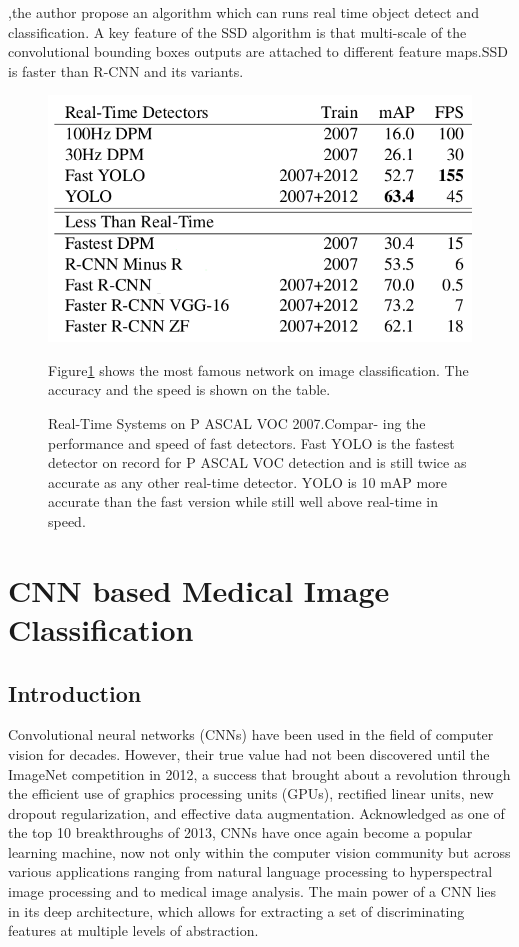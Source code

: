 \documentclass[10pt,twocolumn,letterpaper]{article}
\begin{document}
\cite{liu2016ssd},the author propose an algorithm which can runs real time object detect and classification. A key feature of the SSD algorithm is that multi-scale of the convolutional bounding boxes outputs are attached to different feature maps.SSD is faster than R-CNN and its variants.

\begin{figure}[htbp]
	\begin{center}
		\includegraphics[width=0.8\linewidth]{./Pic/test.png}
	\end{center}
	\caption{Real-Time Systems on P ASCAL VOC 2007.Compar-
		ing the performance and speed of fast detectors. Fast YOLO is
		the fastest detector on record for P ASCAL VOC detection and is
		still twice as accurate as any other real-time detector. YOLO is
		10 mAP more accurate than the fast version while still well above
		real-time in speed.}
	\label{fig:lxsfvgong}

	Figure\ref{fig:lxsfvgong} shows the most famous network on image classification. The accuracy and the speed is shown on the table.

\end{figure}

\section{CNN based Medical Image Classification}

\subsection{Introduction}

Convolutional neural networks (CNNs) have been used in the field of computer vision for decades. However, their true value had not been discovered until the ImageNet competition in 2012, a success that brought about a revolution through the efficient use of graphics processing units (GPUs), rectified linear units, new dropout regularization, and effective data augmentation. Acknowledged as one of the top 10 breakthroughs of 2013, CNNs have once again become a popular learning machine, now not only within the computer vision community but across various applications ranging from natural language processing to hyperspectral image processing and to medical image analysis. The main power of a CNN lies in its deep architecture, which allows for extracting a set of discriminating features at multiple levels of abstraction\cite{tajbakhsh2016convolutional}.
\end{document}
